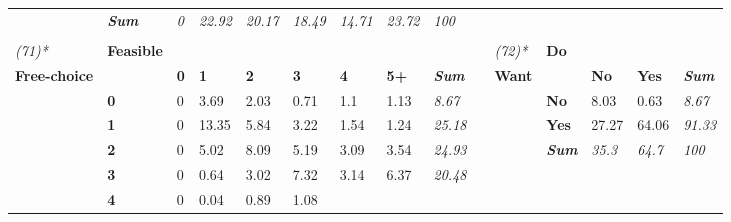 {\begin{center}
\begin{longtable}{lllllllllllllll}
\textit{} &
  \textit{\textbf{Sum}} &
  \textit{0} &
  \textit{22.92} &
  \textit{20.17} &
  \textit{18.49} &
  \textit{14.71} &
  \textit{23.72} &
  \textit{100} &
  \textit{} &
  \textit{} &
  \textit{} &
  \textit{} &
  \textit{} &
  \textit{} \\
\textit{} &
  \textit{\textbf{}} &
  \textit{} &
  \textit{} &
  \textit{} &
  \textit{} &
  \textit{} &
  \textit{} &
  \textit{} &
  \textit{} &
  \textit{} &
  \textit{} &
  \textit{} &
  \textit{} &
  \textit{} \\
\textit{(71)*} &
  \textbf{Feasible} &
   &
   &
   &
   &
   &
   &
  \textit{} &
   &
  \textit{(72)*} &
  \textbf{Do} &
   &
   &
  \textit{} \\
\textbf{Free-choice} &
   &
  \textbf{0} &
  \textbf{1} &
  \textbf{2} &
  \textbf{3} &
  \textbf{4} &
  \textbf{5+} &
  \textit{\textbf{Sum}} &
  \textbf{} &
  \textbf{Want} &
   &
  \textbf{No} &
  \textbf{Yes} &
  \textit{\textbf{Sum}} \\
 &
  \textbf{0} &
  \cellcolor[HTML]{FFFFFF}0 &
  \cellcolor[HTML]{E7E7E7}3.69 &
  \cellcolor[HTML]{F2F2F2}2.03 &
  \cellcolor[HTML]{FBFBFB}0.71 &
  \cellcolor[HTML]{F8F8F8}1.1 &
  \cellcolor[HTML]{F8F8F8}1.13 &
  \textit{8.67} &
   &
   &
  \textbf{No} &
  \cellcolor[HTML]{F5F5F5}8.03 &
  \cellcolor[HTML]{FFFFFF}0.63 &
  \textit{8.67} \\
 &
  \textbf{1} &
  \cellcolor[HTML]{FFFFFF}0 &
  \cellcolor[HTML]{A6A6A6}13.35 &
  \cellcolor[HTML]{D9D9D9}5.84 &
  \cellcolor[HTML]{EAEAEA}3.22 &
  \cellcolor[HTML]{F5F5F5}1.54 &
  \cellcolor[HTML]{F7F7F7}1.24 &
  \textit{25.18} &
   &
   &
  \textbf{Yes} &
  \cellcolor[HTML]{DADADA}27.27 &
  \cellcolor[HTML]{A6A6A6}64.06 &
  \textit{91.33} \\
 &
  \textbf{2} &
  \cellcolor[HTML]{FFFFFF}0 &
  \cellcolor[HTML]{DEDEDE}5.02 &
  \cellcolor[HTML]{CACACA}8.09 &
  \cellcolor[HTML]{DDDDDD}5.19 &
  \cellcolor[HTML]{EBEBEB}3.09 &
  \cellcolor[HTML]{E8E8E8}3.54 &
  \textit{24.93} &
   &
   &
  \textit{\textbf{Sum}} &
  \textit{35.3} &
  \textit{64.7} &
  \textit{100} \\
 &
  \textbf{3} &
  \cellcolor[HTML]{FFFFFF}0 &
  \cellcolor[HTML]{FBFBFB}0.64 &
  \cellcolor[HTML]{EBEBEB}3.02 &
  \cellcolor[HTML]{CFCFCF}7.32 &
  \cellcolor[HTML]{EBEBEB}3.14 &
  \cellcolor[HTML]{D5D5D5}6.37 &
  \textit{20.48} &
   &
   &
   &
   &
   &
  \textit{} \\
 &
  \textbf{4} &
  \cellcolor[HTML]{FFFFFF}0 &
  \cellcolor[HTML]{FFFFFF}0.04 &
  \cellcolor[HTML]{FAFAFA}0.89 &
  \cellcolor[HTML]{F8F8F8}1.08 &

\end{longtable}
\end{center}}
